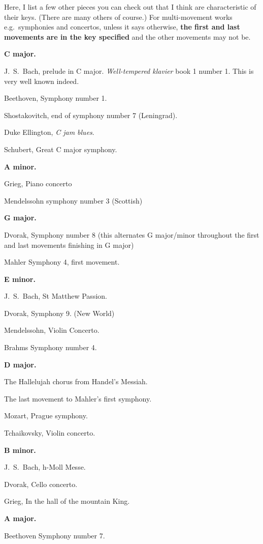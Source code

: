 \documentclass[a4paper]{article}
\begin{document}
Here, I list a few other pieces you can check out that I think
are characteristic of their keys. (There are many others
of course.)  For multi-movement works e.g.~symphonies and concertos,
unless it says otherwise, \textbf{the first and last movements are in the key
specified} and the other movements may not be.

\medskip

\noindent\textbf{C major.}

J.~S.~Bach, prelude in C major. \textit{Well-tempered klavier} book 1 number 1.  This is
very well known indeed.

Beethoven, Symphony number 1.

Shostakovitch,  end of symphony number 7 (Leningrad).

Duke Ellington, \textit{C jam blues}.

Schubert, Great C major symphony.

\noindent\textbf{A minor.}

Grieg, Piano concerto

Mendelssohn symphony number 3 (Scottish)

\noindent\textbf{G major.}

Dvorak, Symphony number 8 (this alternates G major/minor throughout the first and last movements finishing in G major)

Mahler Symphony 4, first movement.

\noindent\textbf{E minor.}

J.~S.~Bach, St Matthew Passion.

Dvorak, Symphony 9. (New World)

Mendelssohn, Violin Concerto.

Brahms Symphony number 4.

\noindent\textbf{D major.}

The Hallelujah chorus from Handel's Messiah.

The last movement to Mahler's first symphony.

Mozart, Prague symphony.

Tchaikovsky, Violin concerto.

\noindent\textbf{B minor.}

J.~S.~Bach, h-Moll Messe.

Dvorak, Cello concerto.

Grieg, In the hall of the mountain King.

\noindent\textbf{A major.}

Beethoven Symphony number 7.
\end{document}
